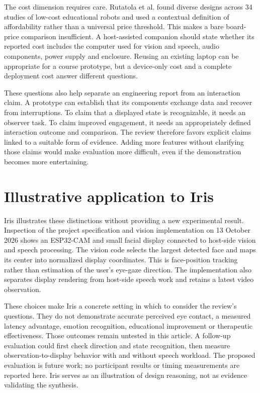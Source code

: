 \documentclass[11pt,a4paper]{article}
\begin{document}
The cost dimension requires care. Rutatola et al. \cite{r4} found diverse designs across 34 studies of low-cost educational robots and used a contextual definition of affordability rather than a universal price threshold. This makes a bare board-price comparison insufficient. A host-assisted companion should state whether its reported cost includes the computer used for vision and speech, audio components, power supply and enclosure. Reusing an existing laptop can be appropriate for a course prototype, but a device-only cost and a complete deployment cost answer different questions.

These questions also help separate an engineering report from an interaction claim. A prototype can establish that its components exchange data and recover from interruptions. To claim that a displayed state is recognizable, it needs an observer task. To claim improved engagement, it needs an appropriately defined interaction outcome and comparison. The review therefore favors explicit claims linked to a suitable form of evidence. Adding more features without clarifying those claims would make evaluation more difficult, even if the demonstration becomes more entertaining.

\section{Illustrative application to Iris}

Iris illustrates these distinctions without providing a new experimental result. Inspection of the project specification and vision implementation on 13 October 2026 shows an ESP32-CAM and small facial display connected to host-side vision and speech processing. The vision code selects the largest detected face and maps its center into normalized display coordinates. This is face-position tracking rather than estimation of the user's eye-gaze direction. The implementation also separates display rendering from host-side speech work and retains a latest video observation.

These choices make Iris a concrete setting in which to consider the review's questions. They do not demonstrate accurate perceived eye contact, a measured latency advantage, emotion recognition, educational improvement or therapeutic effectiveness. Those outcomes remain untested in this article. A follow-up evaluation could first check direction and state recognition, then measure observation-to-display behavior with and without speech workload. The proposed evaluation is future work; no participant results or timing measurements are reported here. Iris serves as an illustration of design reasoning, not as evidence validating the synthesis.
\end{document}
